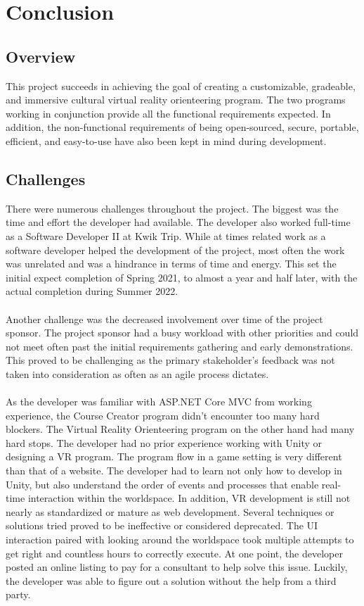 \section{Conclusion}																	
\label{sec:Conclusion}

\subsection{Overview} 
This project succeeds in achieving the goal of creating a customizable, gradeable, and immersive cultural virtual reality orienteering program. The two programs working in conjunction provide all the functional requirements expected. In addition, the non-functional requirements of being open-sourced, secure, portable, efficient, and easy-to-use have also been kept in mind during development.

\subsection{Challenges}
There were numerous challenges throughout the project. The biggest was the time and effort the developer had available. The developer also worked full-time as a Software Developer II at Kwik Trip. While at times related work as a software developer helped the development of the project, most often the work was unrelated and was a hindrance in terms of time and energy. This set the initial expect completion of Spring 2021, to almost a year and half later, with the actual completion during Summer 2022. \\
\\
Another challenge was the decreased involvement over time of the project sponsor. The project sponsor had a busy workload with other priorities and could not meet often past the initial requirements gathering and early demonstrations. This proved to be challenging as the primary stakeholder's feedback was not taken into consideration as often as an agile process dictates.\\
\\ 
As the developer was familiar with ASP.NET Core MVC from working experience, the Course Creator program didn't encounter too many hard blockers. The Virtual Reality Orienteering program on the other hand had many hard stops. The developer had no prior experience working with Unity or designing a VR program. The program flow in a game setting is very different than that of a website. The developer had to learn not only how to develop in Unity, but also understand the order of events and processes that enable real-time interaction within the worldspace. In addition, VR development is still not nearly as standardized or mature as web development. Several techniques or solutions tried proved to be ineffective or considered deprecated.   The UI interaction paired with looking around the worldspace took multiple attempts to get right and countless hours to correctly execute. At one point, the developer posted an online listing to pay for a consultant to help solve this issue. Luckily, the developer was able to figure out a solution without the help from a third party. 

